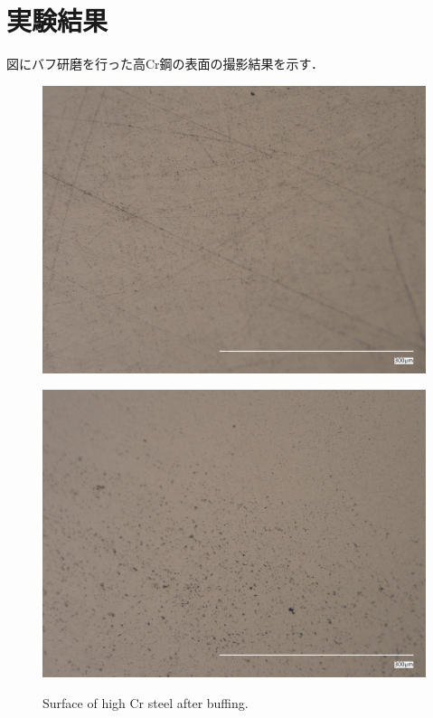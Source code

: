 \section{実験結果}
図にバフ研磨を行った高Cr鋼の表面の撮影結果を示す．

\begin{figure}[htbp]
    \begin{minipage}[htbp]{0.45\linewidth}
      \centering
      \includegraphics[keepaspectratio, scale=0.07]{fig/241218_9Cr_3um.jpg}
      \label{fig:Cr3um}
    \end{minipage}
    \begin{minipage}[htbp]{0.45\linewidth}
      \centering
      \includegraphics[keepaspectratio, scale=0.07]{fig/241218_9Cr_1um.jpg}
      \label{fig:Cr1um}
    \end{minipage}
    \centering
    \caption{Surface of high Cr steel after buffing.}
    \label{fig:CrBuff}
\end{figure}
    
